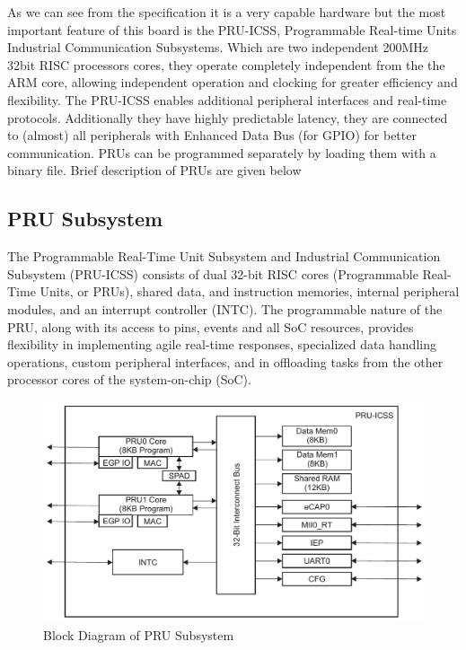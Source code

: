 As we can see from the specification it is a very capable hardware but the most important feature of this board is the PRU-ICSS, Programmable Real-time Units Industrial Communication Subsystems. Which are two independent 200MHz 32bit RISC processors cores, they operate completely independent from the the ARM core,  allowing independent operation and clocking for greater efficiency and flexibility. The PRU-ICSS enables additional peripheral interfaces and real-time protocols. Additionally they have highly predictable latency, they are connected to (almost) all peripherals with Enhanced Data Bus (for GPIO) for better communication. PRUs can be programmed separately by loading them with a binary file. Brief description of PRUs are given below

\subsection{PRU Subsystem}
The Programmable Real-Time Unit Subsystem and Industrial Communication Subsystem (PRU-ICSS) consists of dual 32-bit RISC cores (Programmable Real-Time Units, or PRUs), shared data, and instruction memories, internal peripheral modules, and an interrupt controller (INTC). The programmable nature of the PRU, along with its access to pins, events and all SoC resources, provides flexibility in implementing agile real-time responses, specialized data handling operations, custom peripheral interfaces, and in offloading tasks from the other processor cores of the system-on-chip (SoC).

\begin{figure}
	\includegraphics[width=\textwidth]{fig/PRUIcss.png}
	\caption{Block Diagram of PRU Subsystem}
	\label{fig:prublkdrg}
\end{figure}

